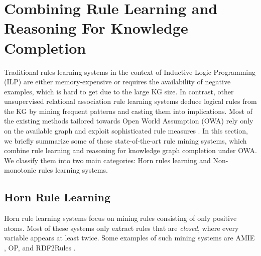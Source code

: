 \section{Combining Rule Learning and Reasoning For Knowledge Completion}
\label{sec:rules_kg_completion}
Traditional rules learning systems in the context of Inductive Logic Programming (ILP) \cite{probfoil,DBLP:conf/ijcai/RaedtDTBV15,DBLP:conf/clima/CorapiSIR11} are either memory-expensive or requires the availability of negative examples, which is hard to get due to the large KG size. In contrast, other unsupervised relational 
association rule learning systems deduce logical rules from the KG by mining frequent patterns and casting them into implications. Most of the  existing methods tailored towards Open World Assumption (OWA) rely only on the available graph and exploit sophisticated rule measures \cite{amie,op,rumis}.
In this section, we briefly summarize some of these state-of-the-art rule mining systems, which combine rule learning and reasoning for knowledge graph completion under OWA. We classify them into two main categories: Horn rules learning and Non-monotonic rules learning systems.
\subsection{Horn Rule Learning}
Horn rule learning systems focus on mining rules consisting of only positive atoms. Most of these systems only extract rules that are \emph{closed}, where every variable appears at least twice. Some examples of such mining systems are AMIE \cite{amie}, OP, \cite{op} and RDF2Rules \cite{rdf2rules}.
